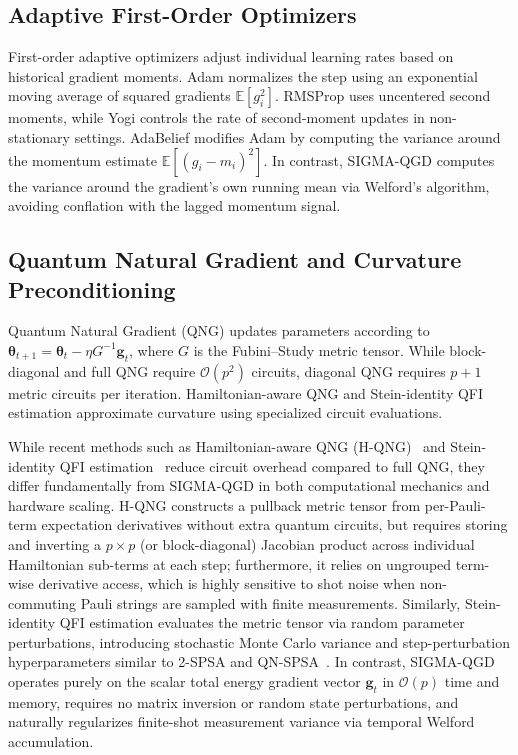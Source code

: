 \documentclass[11pt,a4paper]{article}
\begin{document}
\subsection{Adaptive First-Order Optimizers}
First-order adaptive optimizers adjust individual learning rates based on historical gradient moments. Adam \cite{kingma2014adam} normalizes the step using an exponential moving average of squared gradients $\mathbb{E}[g_i^2]$. RMSProp \cite{tieleman2012lecture} uses uncentered second moments, while Yogi \cite{zaheer2018adaptive} controls the rate of second-moment updates in non-stationary settings. AdaBelief \cite{zhuang2020adabelief} modifies Adam by computing the variance around the momentum estimate $\mathbb{E}[(g_i - m_i)^2]$. In contrast, SIGMA-QGD computes the variance around the gradient's own running mean via Welford's algorithm, avoiding conflation with the lagged momentum signal.

\subsection{Quantum Natural Gradient and Curvature Preconditioning}
Quantum Natural Gradient (QNG) \cite{stokes2020quantum} updates parameters according to $\boldsymbol{\theta}_{t+1} = \boldsymbol{\theta}_t - \eta G^{-1} \mathbf{g}_t$, where $G$ is the Fubini--Study metric tensor. While block-diagonal and full QNG require $\mathcal{O}(p^2)$ circuits, diagonal QNG requires $p+1$ metric circuits per iteration. Hamiltonian-aware QNG \cite{shi2025hamiltonian} and Stein-identity QFI estimation \cite{halla2025stein} approximate curvature using specialized circuit evaluations. 

While recent methods such as Hamiltonian-aware QNG (H-QNG)~\cite{shi2025hamiltonian} and Stein-identity QFI estimation~\cite{halla2025stein} reduce circuit overhead compared to full QNG, they differ fundamentally from SIGMA-QGD in both computational mechanics and hardware scaling. H-QNG constructs a pullback metric tensor from per-Pauli-term expectation derivatives without extra quantum circuits, but requires storing and inverting a $p \times p$ (or block-diagonal) Jacobian product across individual Hamiltonian sub-terms at each step; furthermore, it relies on ungrouped term-wise derivative access, which is highly sensitive to shot noise when non-commuting Pauli strings are sampled with finite measurements. Similarly, Stein-identity QFI estimation evaluates the metric tensor via random parameter perturbations, introducing stochastic Monte Carlo variance and step-perturbation hyperparameters similar to 2-SPSA and QN-SPSA~\cite{gacon2021simultaneous}. In contrast, SIGMA-QGD operates purely on the scalar total energy gradient vector $\mathbf{g}_t$ in $\mathcal{O}(p)$ time and memory, requires no matrix inversion or random state perturbations, and naturally regularizes finite-shot measurement variance via temporal Welford accumulation. 
\end{document}

